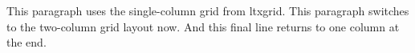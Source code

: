 \documentclass{article}
\begin{document}
\onecolumngrid
This paragraph uses the single-column grid from ltxgrid.
\twocolumngrid
This paragraph switches to the two-column grid layout now.
\onecolumngrid
And this final line returns to one column at the end.
\end{document}
